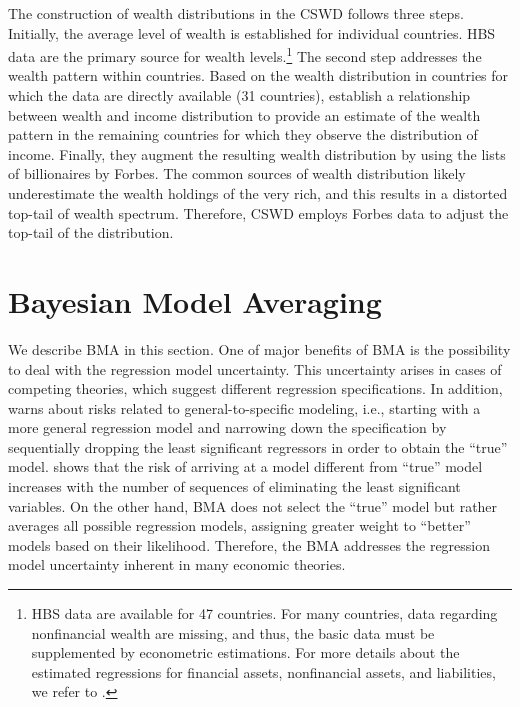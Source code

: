 \documentclass[a4paper,11pt]{article}
\begin{document}
The construction of wealth distributions in the \ac{CSWD} follows three steps. Initially, the average level of wealth is established for individual countries. \ac{HBS} data are the primary source for wealth levels.\footnote{\ac{HBS} data are available for 47 countries. For many countries, data regarding nonfinancial wealth are missing, and thus, the basic data must be supplemented by econometric estimations. For more details about the estimated regressions for financial assets, nonfinancial assets, and liabilities, we refer to \citet{daviesetal2017}.} The second step addresses the wealth pattern within countries. Based on the wealth distribution in countries for which the data are directly available (31 countries), \citet{daviesetal2017} establish a relationship between wealth and income distribution to provide an estimate of the wealth pattern in the remaining countries for which they observe the distribution of income. Finally, they augment the resulting wealth distribution by using the lists of billionaires by Forbes. The common sources of wealth distribution likely underestimate the wealth holdings of the very rich, and this results in a distorted top-tail of wealth spectrum. Therefore, \ac{CSWD} employs Forbes data to adjust the top-tail of the distribution. 

\section{Bayesian Model Averaging}
\label{sec:BMA}
We describe \ac{BMA} in this section. %
One of major benefits of \ac{BMA} is the possibility to deal with the regression model uncertainty. This uncertainty arises in cases of competing theories, which suggest different regression specifications. In addition, \citet{Koop2003} warns about risks related to general-to-specific modeling, i.e., starting with a more general regression model and narrowing down the specification by sequentially dropping the least significant regressors in order to obtain the ``true'' model. \citet{Koop2003} shows that the risk of arriving at a model different from ``true'' model increases with the number of sequences of eliminating the least significant variables. On the other hand, BMA does not select the ``true'' model but rather averages all possible regression models, assigning greater weight to ``better'' models based on their likelihood. Therefore, the \ac{BMA} addresses the regression model uncertainty inherent in many economic theories. 
\end{document}
